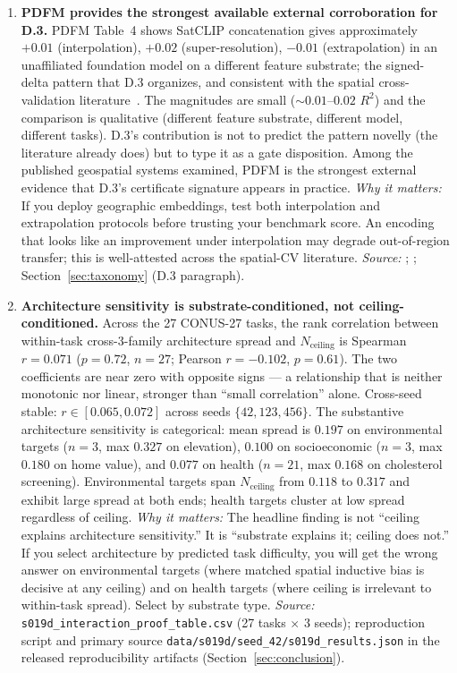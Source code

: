 \documentclass{article}
\begin{document}
\begin{enumerate}
\item \textbf{PDFM provides the strongest available external corroboration for D.3.}
PDFM Table~4 shows SatCLIP concatenation gives approximately $+0.01$ (interpolation), $+0.02$ (super-resolution), $-0.01$ (extrapolation) in an unaffiliated foundation model on a different feature substrate; the signed-delta pattern that D.3 organizes, and consistent with the spatial cross-validation literature~\citep{roberts2017cv,ploton2020spatial,mila2022nndm}. The magnitudes are small (${\sim}0.01$--$0.02$ $R^2$) and the comparison is qualitative (different feature substrate, different model, different tasks). D.3's contribution is not to predict the pattern novelly (the literature already does) but to type it as a gate disposition. Among the published geospatial systems examined, PDFM is the strongest external evidence that D.3's certificate signature appears in practice.
\emph{Why it matters:} If you deploy geographic embeddings, test both interpolation and extrapolation protocols before trusting your benchmark score. An encoding that looks like an improvement under interpolation may degrade out-of-region transfer; this is well-attested across the spatial-CV literature.
\emph{Source:} \citet[Table~4]{agarwal2025pdfm}; \citet{roberts2017cv,ploton2020spatial,mila2022nndm}; Section~\ref{sec:taxonomy} (D.3 paragraph).

\item \textbf{Architecture sensitivity is substrate-conditioned, not ceiling-conditioned.}
Across the 27 CONUS-27 tasks, the rank correlation between within-task cross-3-family architecture spread and $N_{\text{ceiling}}$ is Spearman $r = 0.071$ ($p = 0.72$, $n = 27$; Pearson $r = -0.102$, $p = 0.61$). The two coefficients are near zero with opposite signs --- a relationship that is neither monotonic nor linear, stronger than ``small correlation'' alone. Cross-seed stable: $r \in [0.065, 0.072]$ across seeds $\{42, 123, 456\}$. The substantive architecture sensitivity is categorical: mean spread is $0.197$ on environmental targets ($n=3$, max $0.327$ on elevation), $0.100$ on socioeconomic ($n=3$, max $0.180$ on home value), and $0.077$ on health ($n=21$, max $0.168$ on cholesterol screening). Environmental targets span $N_{\text{ceiling}}$ from $0.118$ to $0.317$ and exhibit large spread at both ends; health targets cluster at low spread regardless of ceiling.
\emph{Why it matters:} The headline finding is not ``ceiling explains architecture sensitivity.'' It is ``substrate explains it; ceiling does not.'' If you select architecture by predicted task difficulty, you will get the wrong answer on environmental targets (where matched spatial inductive bias is decisive at any ceiling) and on health targets (where ceiling is irrelevant to within-task spread). Select by substrate type.
\emph{Source:} \texttt{s019d\_interaction\_proof\_table.csv} (27 tasks $\times$ 3 seeds); reproduction script and primary source \texttt{data/s019d/seed\_42/s019d\_results.json} in the released reproducibility artifacts (Section~\ref{sec:conclusion}).

\end{enumerate}
\end{document}
